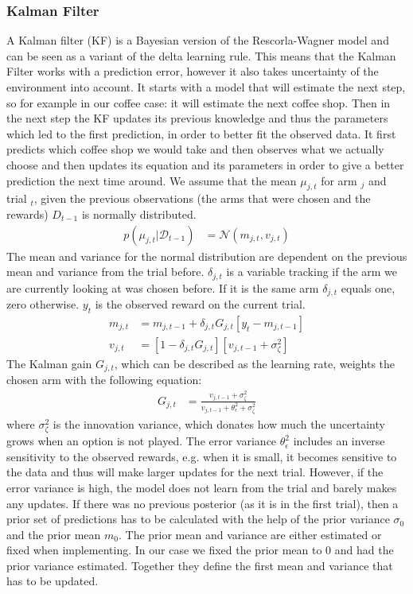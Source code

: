 \subsubsection{Kalman Filter} %
A Kalman filter (KF) is a Bayesian version of the Rescorla-Wagner model \citep{gershman2015unifying} and can be seen as a variant of the delta learning rule. This means that the Kalman Filter works with a prediction error, however it also takes uncertainty of the environment into account. It starts with a model that will estimate the next step, so for example in our coffee case: it will estimate the next coffee shop. Then in the next step the KF updates its previous knowledge and thus the parameters which led to the first prediction, in order to better fit the observed data. It first predicts which coffee shop we would take and then observes what we actually choose and then updates its equation and its parameters in order to give a better prediction the next time around. We assume that the mean $\mu_{j,t}$ for arm $_j$ and trial $_t$, given the previous observations (the arms that were chosen and the rewards) $D_{t-1}$ is normally distributed.
\begin{align}
    p(\mu_{j,t}|\mathcal{D}_{t-1}) &= \mathcal{N}(m_{j,t},v_{j,t})
\end{align}
The mean and variance for the normal distribution are dependent on the previous mean and variance from the trial before. $\delta_{j,t}$ is a variable tracking if the arm we are currently looking at was chosen before. If it is the same arm $\delta_{j,t}$ equals one, zero otherwise. $y_t$ is the observed reward on the current trial. 
\begin{align}
    m_{j,t} &= m_{j,t-1} + \delta_{j,t}G_{j,t}\left[y_t-m_{j,t-1}\right]
    \\
    v_{j,t} &= \left[1 - \delta_{j,t}G_{j,t}\right]\left[v_{j,t-1}+\sigma_\zeta^2 \right]
\end{align}
The Kalman gain $G_{j,t}$, which can be described as the learning rate, weights the chosen arm with the following equation:  
\begin{align}
G_{j,t} &= \frac{v_{j,t-1}+\sigma_\zeta^2}{v_{j,t-1}+ \theta_\epsilon^2+\sigma_\zeta^2}
\end{align}
where $\sigma_\zeta^2$ is the innovation variance, which donates how much the uncertainty grows when an option is not played. The error variance $\theta_\epsilon^2$ includes an inverse sensitivity to the observed rewards, e.g. when it is small, it becomes sensitive to the data and thus will make larger updates for the next trial. However, if the error variance is high, the model does not learn from the trial and barely makes any updates. 
If there was no previous posterior (as it is in the first trial), then a prior set of predictions has to be calculated with the help of the prior variance $\sigma_0$ and the prior mean $m_0$. The prior mean and variance are either estimated or fixed when implementing. In our case we fixed the prior mean to 0 and had the prior variance estimated. Together they define the first mean and variance that has to be updated. 

